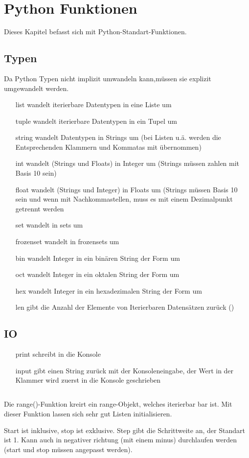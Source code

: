 \section{Python Funktionen}
Dieses Kapitel befasst sich mit Python-Standart-Funktionen.

\subsection{Typen}
Da Python Typen nicht implizit umwandeln kann,müssen sie explizit umgewandelt werden.
\begin{itemize}
\item[list] wandelt iterierbare Datentypen in eine Liste um
\item[tuple] wandelt iterierbare Datentypen in ein Tupel um
\item[string] wandelt Datentypen in Strings um (bei Listen u.ä. werden die
Entsprechenden Klammern und Kommatas mit übernommen)
\item[int] wandelt (Strings und Floats) in Integer um (Strings müssen zahlen mit Basis 10 sein)
\item[float] wandelt (Strings und Integer) in Floats um (Strings müssen Basis 10 sein und wenn mit Nachkommastellen, muss es mit einem Dezimalpunkt getrennt werden
 \item[set] wandelt in sets um
 \item[frozenset] wandelt in frozensets um
 \item[bin] wandelt Integer in ein binären String der Form  um
 \item[oct] wandelt Integer in ein oktalen String der Form  um
 \item[hex] wandelt Integer in ein hexadezimalen String der Form  um
 \item[len] gibt die Anzahl der Elemente von Iterierbaren Datensätzen zurück ()
\end{itemize}

\subsection{IO}
\begin{itemize}
\item[print] schreibt in die Konsole
\item[input] gibt einen String zurück mit der Konsoleneingabe, der Wert in der Klammer wird zuerst in die Konsole geschrieben

\end{itemize}

\subsection{}
Die range()-Funktion kreirt ein range-Objekt, welches iterierbar bar ist. Mit dieser
Funktion lassen sich sehr gut Listen initialisieren.

Start ist inklusive, stop ist exklusive. Step gibt die Schrittweite an, der Standart ist 1. Kann auch in
negativer richtung (mit einem minus) durchlaufen werden (start und stop müssen angepasst werden).

